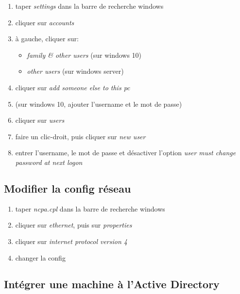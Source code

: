 \documentclass[a4paper]{article}
\begin{document}
\begin{enumerate}
    \item taper \textit{settings} dans la barre de recherche windows
    \item cliquer sur \textit{accounts}
    \item à gauche, cliquer sur:
    \begin{itemize}
        \item \textit{family \& other users} (sur windows 10)
        \item \textit{other users} (sur windows server)
    \end{itemize}
    \item cliquer sur \textit{add someone else to this pc}
    \item (sur windows 10, ajouter l'username et le mot de passe)
    \item cliquer sur \textit{users}
    \item faire un clic-droit, puis cliquer sur \textit{new user}
    \item entrer l'username, le mot de passe et désactiver l'option \textit{user must change password at next logon}
\end{enumerate}





\subsection{Modifier la config réseau}



\begin{enumerate}
    \item taper \textit{ncpa.cpl} dans la barre de recherche windows
    \item cliquer sur \textit{ethernet}, puis sur \textit{properties}
    \item cliquer sur \textit{internet protocol version 4}
    \item changer la config
\end{enumerate}





\subsection{Intégrer une machine à l'Active Directory}
\end{document}
